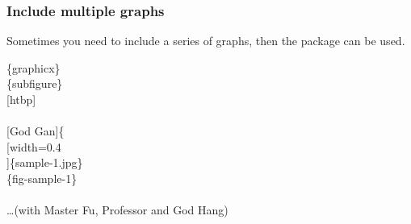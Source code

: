 \begin{frame}
	\frametitle{Include multiple graphs}
	Sometimes you need to include a series of graphs, then the  package can be used.\\
	\begin{minipage}{0.55\linewidth}
		\begin{example}
			\{graphicx\}\\
			\{subfigure\}\\
			[htbp]\\
			\qquad {}\\
			\qquad {}\{\\
			\qquad {}[width=0.4\\
			]\{sample-1.jpg\}\\
			\qquad\qquad {}\{fig-sample-1\}\\
			\qquad \\
			\qquad \dots(with Master Fu, Professor and God Hang)\\
		\end{example}
	\end{minipage}
	\hfill
	\begin{minipage}{0.4\linewidth}
		\begin{figure}[htbp]
			\centering
\end{figure}
\end{minipage}
\end{frame}
